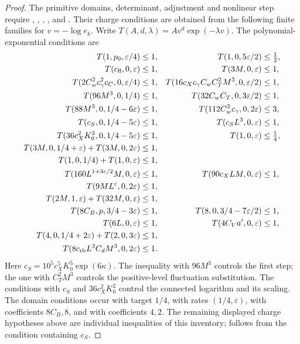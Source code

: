 \begin{proof}
The primitive domains, determinant, adjustment and nonlinear
step require ,
,
,
,
 and
.
Their charge conditions are obtained from the following
finite families for $v=-\log e_k$.
Write $T(A,d,\lambda)=Av^d\exp(-\lambda v)$.
The polynomial-exponential conditions are
\begin{align}
 T(1,p_0,\varepsilon/4)&\le1,&
 T(1,0,5\varepsilon/2)&\le\tfrac12,\notag\\
 T(c_{\mathrm{fl}},0,\varepsilon)&\le1,&
 T(3M,0,\varepsilon)&\le1,\notag\\
 T(2C_w^2c_\gamma^2c_C,0,\varepsilon/4)&\le1,&
 T(16c_Xc_\gamma C_wC_T^2M^3,0,\varepsilon/2)&\le1,\notag\\
 T(96M^3,0,1/4)&\le1,&
 T(32C_wC_T,0,3\varepsilon/2)&\le1,\notag\\
 T(88M^3,0,1/4-6\varepsilon)&\le1,&
 T(112C_w^2c_\gamma,0,2\varepsilon)&\le3,\notag\\
 T(c_S,0,1/4-5\varepsilon)&\le1,&
 T(c_SL^3,0,\varepsilon)&\le1,\notag\\
 T(36c_X^2K_0^2,0,1/4-5\varepsilon)&\le1,&
 T(1,0,\varepsilon)&\le\tfrac14,\notag\\
 T(3M,0,1/4+\varepsilon)+T(3M,0,2\varepsilon)&\le1,\notag\\
 T(1,0,1/4)+T(1,0,\varepsilon)&\le1,\notag\\
 T(160L^{1+3\varepsilon/2}M,0,\varepsilon)&\le1,&
 T(90c_XLM,0,\varepsilon)&\le1,\notag\\
 T(9ML^\varepsilon,0,2\varepsilon)&\le1,\notag\\
 T(2M,1,\varepsilon)+T(32M,0,\varepsilon)&\le1,\notag\\
 T(8C_B,p,3/4-3\varepsilon)&\le1,&
 T(8,0,3/4-7\varepsilon/2)&\le1,\notag\\
 T(6L,0,\varepsilon)&\le1,&
 T(4C_Va',0,\varepsilon)&\le1,\notag\\
 T(4,0,1/4+2\varepsilon)+T(2,0,3\varepsilon)&\le1,\notag\\
 T(8c_{\mathrm{rb}}L^3C_dM^3,0,2\varepsilon)&\le1.
                                      \label{eq:constants-running-inventory}
\end{align}
Here $c_S=10^5c_X^5K_0^5\exp(6\kappa)$.
The inequality with $96M^3$ controls the first step;
the one with $C_T^2M^3$ controls the positive-level
fluctuation substitution. The conditions with $c_S$
and $36c_X^2K_0^2$ control the connected logarithm and its scaling.
The domain conditions occur with target $1/4$,
with rates $(1/4,\varepsilon)$, with coefficients
$8C_B,8$, and with coefficients $4,2$.
The remaining displayed charge hypotheses above are
individual inequalities of this inventory;
 follows from the
condition containing $c_S$.


\end{proof}
